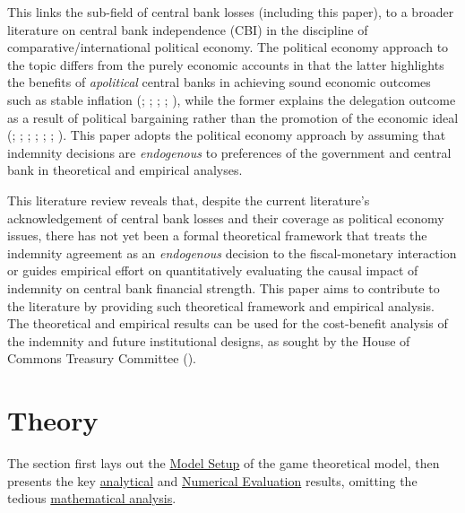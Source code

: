 \documentclass[
  a4paper,
  abstract=true]{scrartcl}
\theoremstyle{definition}
\begin{document}
This links the sub-field of central bank losses (including this paper),
to a broader literature on central bank independence (CBI) in the
discipline of comparative/international political economy. The political
economy approach to the topic differs from the purely economic accounts
in that the latter highlights the benefits of \emph{apolitical} central
banks in achieving sound economic outcomes such as stable inflation
(;
;
;
;
), while the former explains the
delegation outcome as a result of political bargaining rather than the
promotion of the economic ideal (; ;
;
;
;
;
). This paper adopts the
political economy approach by assuming that indemnity decisions are
\emph{endogenous} to preferences of the government and central bank in
theoretical and empirical analyses.

This literature review reveals that, despite the current literature's
acknowledgement of central bank losses and their coverage as political
economy issues, there has not yet been a formal theoretical framework
that treats the indemnity agreement as an \emph{endogenous} decision to
the fiscal-monetary interaction or guides empirical effort on
quantitatively evaluating the causal impact of indemnity on central bank
financial strength. This paper aims to contribute to the literature by
providing such theoretical framework and empirical analysis. The
theoretical and empirical results can be used for the cost-benefit
analysis of the indemnity and future institutional designs, as sought by
the House of Commons Treasury Committee ().

\section{Theory}\label{sec-theory}

The section first lays out the \hyperref[model-setup]{Model Setup} of
the game theoretical model, then presents the key
\hyperref[sec-analytical-main]{analytical} and
\hyperref[sec-simulation]{Numerical Evaluation} results, omitting the
tedious \hyperref[sec-model-app]{mathematical analysis}.
\end{document}
